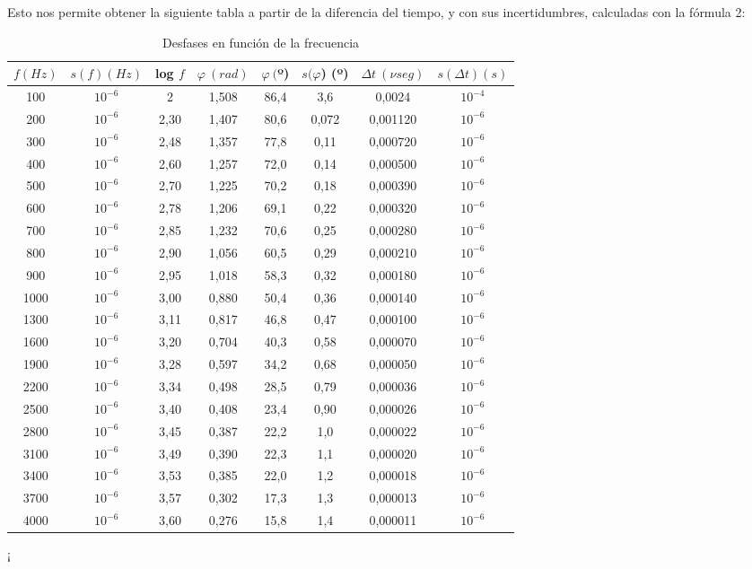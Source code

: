 \documentclass[10pt,a4paper]{article}
\begin{document}
Esto nos permite obtener la siguiente tabla a partir de la diferencia del tiempo, y con sus incertidumbres, calculadas con la fórmula 2:
\begin{table}[h] %


\begin{center}
\begin{tabular}{| c | c | c | c | c | c | c | c |}
\hline
$f(Hz)$ & $s(f) (Hz) $ & log $ f $ & $\varphi \ (rad) $ & $\varphi \ ($º) & $ s(\varphi$) (º) & $\Delta t \ (\nu seg) $ & $s(\Delta t)  (s) $ 
  \\ \hline
100 & $10^{-6}$ & 2 & 1,508 & 86,4 & 3,6 & 0,0024 & $10^{-4}$
  \\ 
200 & $10^{-6}$ & 2,30 & 1,407 & 80,6 & 0,072 & 0,001120 & $10^{-6}$
  \\ 
300 & $10^{-6}$ & 2,48 & 1,357 & 77,8 & 0,11 & 0,000720 & $10^{-6}$
  \\ 
400 & $10^{-6}$ & 2,60 & 1,257 & 72,0 & 0,14 & 0,000500 & $10^{-6}$
  \\ 
500 & $10^{-6}$ & 2,70 & 1,225 & 70,2 & 0,18 & 0,000390 & $10^{-6}$
  \\ 
600 & $10^{-6}$ & 2,78 & 1,206 & 69,1 & 0,22 & 0,000320 & $10^{-6}$
  \\ 
700 & $10^{-6}$ & 2,85 & 1,232 & 70,6 & 0,25 & 0,000280 & $10^{-6}$
  \\ 
800 & $10^{-6}$ & 2,90 & 1,056 & 60,5 & 0,29 & 0,000210 & $10^{-6}$
  \\ 
900 & $10^{-6}$ & 2,95 & 1,018 & 58,3 & 0,32 & 0,000180 & $10^{-6}$
  \\ 
1000 & $10^{-6}$ & 3,00 & 0,880 & 50,4 & 0,36 & 0,000140 & $10^{-6}$
  \\ 
1300 & $10^{-6}$ & 3,11 & 0,817 & 46,8 & 0,47 & 0,000100 & $10^{-6}$
  \\ 
1600 & $10^{-6}$ & 3,20 & 0,704 & 40,3 & 0,58 & 0,000070 & $10^{-6}$
  \\ 
1900 & $10^{-6}$ & 3,28 & 0,597 & 34,2 & 0,68 & 0,000050 & $10^{-6}$
  \\ 
2200 & $10^{-6}$ & 3,34 & 0,498 & 28,5 & 0,79 & 0,000036 & $10^{-6}$
  \\ 
2500 & $10^{-6}$ & 3,40 & 0,408 & 23,4 & 0,90 & 0,000026 & $10^{-6}$
  \\ 
2800 & $10^{-6}$ & 3,45 & 0,387 & 22,2 & 1,0 & 0,000022 & $10^{-6}$
  \\ 
3100 & $10^{-6}$ & 3,49 & 0,390 & 22,3 & 1,1 & 0,000020 & $10^{-6}$
  \\ 
3400 & $10^{-6}$ & 3,53 & 0,385 & 22,0 & 1,2 & 0,000018 & $10^{-6}$
  \\ 
3700 & $10^{-6}$ & 3,57 & 0,302 & 17,3 & 1,3 & 0,000013 & $10^{-6}$
  \\ 
4000 & $10^{-6}$ & 3,60 & 0,276 & 15,8 & 1,4 & 0,000011 & $10^{-6}$
  \\ \hline
\end{tabular}
\label{Desfases}¡
\caption{Desfases en función de la frecuencia}
\end{center}

\end{table}
\end{document}
